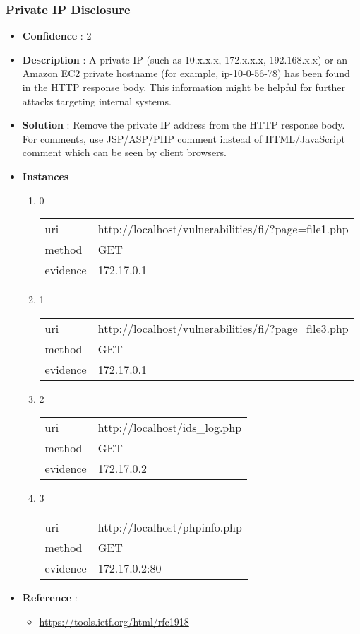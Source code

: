 \documentclass[10pt]{article}
\begin{document}
\subsubsection{Private IP Disclosure}
\begin{itemize}
\item[] \textbf{Confidence} : 2
\item[] \textbf{Description} : A private IP (such as 10.x.x.x, 172.x.x.x, 192.168.x.x) or an Amazon EC2 private hostname (for example, ip-10-0-56-78) has been found in the HTTP response body. This information might be helpful for further attacks targeting internal systems.
\item[] \textbf{Solution} :  Remove the private IP address from the HTTP response body.  For comments, use JSP/ASP/PHP comment instead of HTML/JavaScript comment which can be seen by client browsers.
\item[] \textbf{Instances}
\begin{enumerate}
\item[] 0
\begin{tabular}{| l | p{12cm}}
uri & http://localhost/vulnerabilities/fi/?page=file1.php \\
method & GET \\
evidence & 172.17.0.1 \\
\end{tabular}
\item[] 1
\begin{tabular}{| l | p{12cm}}
uri & http://localhost/vulnerabilities/fi/?page=file3.php \\
method & GET \\
evidence & 172.17.0.1 \\
\end{tabular}
\item[] 2
\begin{tabular}{| l | p{12cm}}
uri & http://localhost/ids\_log.php \\
method & GET \\
evidence & 172.17.0.2 \\
\end{tabular}
\item[] 3
\begin{tabular}{| l | p{12cm}}
uri & http://localhost/phpinfo.php \\
method & GET \\
evidence & 172.17.0.2:80 \\
\end{tabular}
\end{enumerate}
\item[] \textbf{Reference} : 
\begin{itemize}
\item \url{https://tools.ietf.org/html/rfc1918}
\end{itemize}
\end{itemize}
\end{document}
